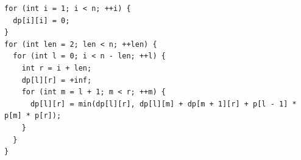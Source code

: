 \begin{lstlisting}
for (int i = 1; i < n; ++i) {
  dp[i][i] = 0;
}
for (int len = 2; len < n; ++len) {
  for (int l = 0; i < n - len; ++l) {
    int r = i + len;
    dp[l][r] = +inf;
    for (int m = l + 1; m < r; ++m) {
      dp[l][r] = min(dp[l][r], dp[l][m] + dp[m + 1][r] + p[l - 1] * p[m] * p[r]);
    }
  }
}
\end{lstlisting}

\pagebreak